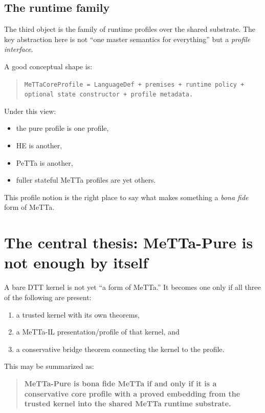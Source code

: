\documentclass[11pt]{article}
\begin{document}
\subsection{The runtime family}

The third object is the family of runtime profiles over the shared substrate. The key abstraction here is not ``one master semantics for everything'' but a \emph{profile interface}.

A good conceptual shape is:

\begin{quote}
\texttt{MeTTaCoreProfile = LanguageDef + premises + runtime policy + optional state constructor + profile metadata.}
\end{quote}

Under this view:

\begin{itemize}
  \item the pure profile is one profile,
  \item HE is another,
  \item PeTTa is another,
  \item fuller stateful MeTTa profiles are yet others.
\end{itemize}

This profile notion is the right place to say what makes something a \emph{bona fide} form of MeTTa.

\section{The central thesis: MeTTa-Pure is not enough by itself}

A bare DTT kernel is not yet ``a form of MeTTa.'' It becomes one only if all three of the following are present:

\begin{enumerate}
  \item a trusted kernel with its own theorems,
  \item a MeTTa-IL presentation/profile of that kernel, and
  \item a conservative bridge theorem connecting the kernel to the profile.
\end{enumerate}

This may be summarized as:

\begin{quote}
\textbf{MeTTa-Pure is bona fide MeTTa if and only if it is a conservative core profile with a proved embedding from the trusted kernel into the shared MeTTa runtime substrate.}
\end{quote}
\end{document}
